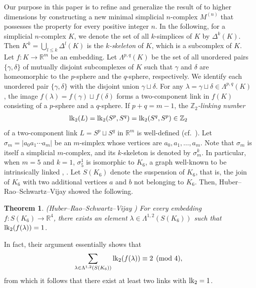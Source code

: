 \documentclass{amsart}
\newtheorem{Theorem}{Theorem}[section]
\theoremstyle{definition}
\theoremstyle{remark}
\numberwithin{equation}{section}
\begin{document}
Our purpose in this paper is to refine and generalize the result of \cite{HRJV26} to higher dimensions by constructing a new minimal simplicial $n$-complex $M^{(n)}$ that possesses the property for every positive integer $n$. In the following, for a simplicial $n$-complex $K$, we denote the set of all $k$-simplices of $K$ by $\varDelta^{k}(K)$. Then $K^{k} = \bigcup_{l \le k} \varDelta^{l}(K)$ is the \textit{$k$-skeleton} of $K$, which is a subcomplex of $K$. Let $f \colon K \to \mathbb{R}^{m}$ be an embedding. Let $\Lambda^{p,q}(K)$ be the set of all unordered pairs $\{\gamma, \delta\}$ of mutually disjoint subcomplexes of $K$ such that $\gamma$ and $\delta$ are homeomorphic to the $p$-sphere and the $q$-sphere, respectively. We identify each unordered pair $\{\gamma,\delta\}$ with the disjoint union $\gamma \sqcup \delta$. For any $\lambda = \gamma \sqcup \delta \in \Lambda^{p,q}(K)$, the image $f(\lambda) = f(\gamma) \sqcup f(\delta)$ forms a two-component link in $f(K)$ consisting of a $p$-sphere and a $q$-sphere. If $p + q = m-1$, the \textit{$\mathbb{Z}_2$-linking number}
\begin{eqnarray*}
{\rm lk}_2(L) = {\rm lk}_2(S^p,S^q) = {\rm lk}_2(S^q,S^p) \in \mathbb{Z}_2
\end{eqnarray*}
of a two-component link $L = S^p \sqcup S^q$ in $\mathbb{R}^m$ is well-defined (cf.\ \cite{ST80}). Let $\sigma_{m} = |a_{0}a_{1}\cdots a_{m}|$ be an $m$-simplex whose vertices are $a_{0},a_{1},\ldots,a_{m}$. Note that $\sigma_{m}$ is itself a simplicial $m$-complex, and its $k$-skeleton is denoted by $\sigma_{m}^{k}$. In particular, when $m=5$ and $k=1$, $\sigma_5^1$ is isomorphic to $K_6$, a graph well-known to be intrinsically linked \cite{CG83}, \cite{S84}. Let $S(K_6)$ denote the suspension of $K_6$, that is, the join of $K_6$ with two additional vertices $a$ and $b$ not belonging to $K_6$. Then, Huber--Rao--Schwartz--Vijay showed the following.


\begin{Theorem}\label{ILR4} 
{\rm (Huber--Rao--Schwartz--Vijay \cite{HRJV26})} 
For every embedding $f \colon S(K_6) \to \mathbb{R}^{4}$, there exists an element $\lambda \in \Lambda^{1,2}(S(K_6))$ such that ${\rm lk}_2(f(\lambda)) = 1$. 
\end{Theorem}

In fact, their argument essentially shows that 
\begin{eqnarray*}
\sum_{\lambda \in \Lambda^{1,2}(S(K_6))} {\rm lk}_2(f(\lambda)) \equiv 2 \pmod{4},
\end{eqnarray*}
from which it follows that there exist at least two links with ${\rm lk}_2 = 1$.
\end{document}
